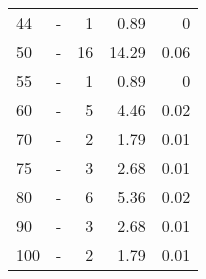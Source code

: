 \begin{longtable}{lXrrr}
        44 & \multicolumn{1}{X}{-} & %
          \num{1} &
          \num[round-mode=places,round-precision=2]{0,89} &
          \num[round-mode=places,round-precision=2]{0} \\

        50 & \multicolumn{1}{X}{-} & %
          \num{16} &
          \num[round-mode=places,round-precision=2]{14,29} &
          \num[round-mode=places,round-precision=2]{0,06} \\

        55 & \multicolumn{1}{X}{-} & %
          \num{1} &
          \num[round-mode=places,round-precision=2]{0,89} &
          \num[round-mode=places,round-precision=2]{0} \\

        60 & \multicolumn{1}{X}{-} & %
          \num{5} &
          \num[round-mode=places,round-precision=2]{4,46} &
          \num[round-mode=places,round-precision=2]{0,02} \\

        70 & \multicolumn{1}{X}{-} & %
          \num{2} &
          \num[round-mode=places,round-precision=2]{1,79} &
          \num[round-mode=places,round-precision=2]{0,01} \\

        75 & \multicolumn{1}{X}{-} & %
          \num{3} &
          \num[round-mode=places,round-precision=2]{2,68} &
          \num[round-mode=places,round-precision=2]{0,01} \\

        80 & \multicolumn{1}{X}{-} & %
          \num{6} &
          \num[round-mode=places,round-precision=2]{5,36} &
          \num[round-mode=places,round-precision=2]{0,02} \\

        90 & \multicolumn{1}{X}{-} & %
          \num{3} &
          \num[round-mode=places,round-precision=2]{2,68} &
          \num[round-mode=places,round-precision=2]{0,01} \\

        100 & \multicolumn{1}{X}{-} & %
          \num{2} &
          \num[round-mode=places,round-precision=2]{1,79} &
          \num[round-mode=places,round-precision=2]{0,01} \\


\end{longtable}

